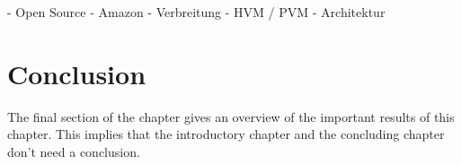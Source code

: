 - Open Source
- Amazon
- Verbreitung 
- HVM / PVM
- Architektur


\section{Conclusion}
The final section of the chapter gives an overview of the important results
of this chapter. This implies that the introductory chapter and the
concluding chapter don't need a conclusion.

\lipsum[66]


